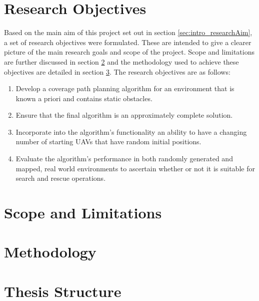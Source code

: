 \section{Research Objectives}
\label{sec:intro_Objectives}
Based on the main aim of this project set out in section \ref{sec:intro_researchAim}, a set of research objectives were formulated. These are intended to give a clearer picture of the main research goals and scope of the project. Scope and limitations are further discussed in section \ref{sec:intro_scope} and the methodology used to achieve these objectives are detailed in section \ref{sec:intro_method}. The research objectives are as follows:
\begin{enumerate}
	\item Develop a coverage path planning algorithm for an environment that is known a priori and contains static obstacles.
	\item Ensure that the final algorithm is an approximately complete solution.
	\item Incorporate into the algorithm's functionality an ability to have a changing number of starting UAVs that have random initial positions.
	\item Evaluate the algorithm's performance in both randomly generated and mapped, real world environments to ascertain whether or not it is suitable for search and rescue operations.
\end{enumerate}

\section{Scope and Limitations}
\label{sec:intro_scope}

\section{Methodology}
\label{sec:intro_method}

\section{Thesis Structure}
\label{sec:intro_struct}
